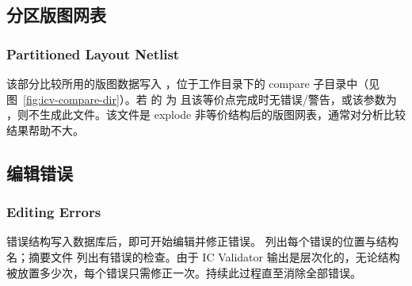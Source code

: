 \subsection{分区版图网表}
\subsubsection*{Partitioned Layout Netlist}

该部分比较所用的版图数据写入 ，位于工作目录下的 compare 子目录中（见图~\ref{fig:icv-compare-dir}）。若  的  为  且该等价点完成时无错误/警告，或该参数为 ，则不生成此文件。该文件是 explode 非等价结构后的版图网表，通常对分析比较结果帮助不大。

\subsection{编辑错误}
\subsubsection*{Editing Errors}

错误结构写入数据库后，即可开始编辑并修正错误。 列出每个错误的位置与结构名；摘要文件  列出有错误的检查。由于 IC Validator 输出是层次化的，无论结构被放置多少次，每个错误只需修正一次。持续此过程直至消除全部错误。

